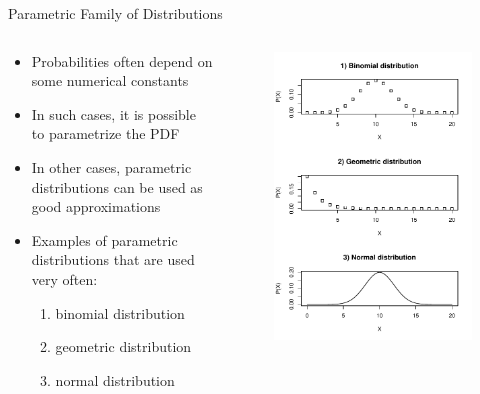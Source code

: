 \begin{frame}{Parametric Family of Distributions}

    \begin{columns}
    \begin{column}{0.5\textwidth}
        {\small
        \begin{itemize}
            \item Probabilities often depend on some numerical constants
            \item In such cases, it is possible to parametrize the PDF
            \item In other cases, parametric distributions can be used as good approximations
            \item Examples of parametric distributions that are used very often:
            \begin{enumerate}
                \item binomial distribution
                \item geometric distribution
                \item normal distribution
            \end{enumerate}
        \end{itemize}
        }
    \end{column}
    \begin{column}{0.5\textwidth}
         \begin{figure}
             \includegraphics[width=\textwidth]{R/plots/distributions}

\end{figure}
\end{column}
\end{columns}
\end{frame}
